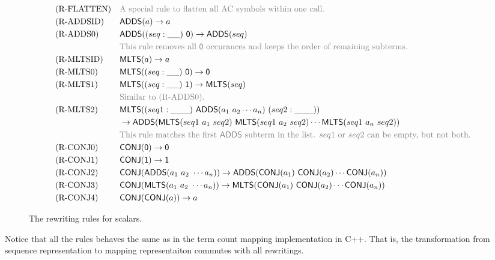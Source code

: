\documentclass{article}
\begin{document}
\begin{figure}[h]
    \begin{align*}
        & \text{(R-FLATTEN)} &&
        \textcolor{gray}{\text{A special rule to flatten all AC symbols within one call.}} \\
        & \text{(R-ADDSID)} &&
        \ADDS(a) \to a \\
        & \text{(R-ADDS0)} &&
        \ADDS((seq:\_ \_)\ \ZERO) \to \ADDS(seq) \\
        & && \textcolor{gray}{\text{This rule removes all $\ZERO$ occurances and keeps the order of remaining subterms.}} \\
        & \text{(R-MLTSID)} &&
        \MLTS(a) \to a \\
        & \text{(R-MLTS0)} &&
        \MLTS((seq: \_ \_)\ \ZERO) \to \ZERO \\
        & \text{(R-MLTS1)} &&
        \MLTS((seq: \_ \_)\ \ONE) \to \MLTS(seq) \\
        & && \textcolor{gray}{\text{Similar to (R-ADDS0).}} \\
        & \text{(R-MLTS2)} &&
        \MLTS((seq1: \_ \_ \_)\ \ADDS(a_1\ a_2 \cdots a_n)\ (seq2: \_ \_ \_)) \\
        & && \to \ADDS(\MLTS(seq1\ a_1\ seq2)\ \MLTS(seq1\ a_2\ seq2) \cdots \MLTS(seq1\ a_n\ seq2)) \\
        & && \textcolor{gray}{\text{This rule matches the first $\ADDS$ subterm in the list. $seq1$ or $seq2$ can be empty, but not both.}} \\
        & \text{(R-CONJ0)} &&
        \CONJ(\ZERO) \to \ZERO \\
        & \text{(R-CONJ1)} &&
        \CONJ(\ONE) \to \ONE \\
        & \text{(R-CONJ2)} &&
        \CONJ(\ADDS(a_1\ a_2\ \cdots a_n)) \to \ADDS(\CONJ(a_1)\ \CONJ(a_2) \cdots \CONJ(a_n)) \\
        & \text{(R-CONJ3)} &&
        \CONJ(\MLTS(a_1\ a_2\ \cdots a_n)) \to \MLTS(\CONJ(a_1)\ \CONJ(a_2) \cdots \CONJ(a_n)) \\
        & \text{(R-CONJ4)} &&
        \CONJ(\CONJ(a)) \to a
    \end{align*}
    \caption{The rewriting rules for scalars.}
\end{figure}

Notice that all the rules behaves the same as in the term count mapping implementation in C++. That is, the transformation from sequence representation to mapping representaiton commutes with all rewritings.
\end{document}
